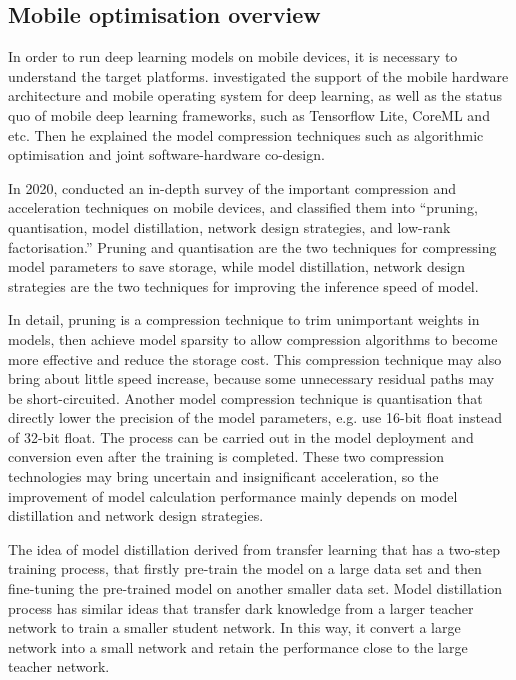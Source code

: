 \subsection{Mobile optimisation overview}
In order to run deep learning models on mobile devices, it is necessary to understand the target platforms.
\citet{deng2019deep} investigated the support of the mobile hardware architecture and mobile operating system for deep learning, as well as the status quo of mobile deep learning frameworks, such as Tensorflow Lite, CoreML and etc.
Then he explained the model compression techniques such as algorithmic optimisation and joint software-hardware co-design.

In 2020, \citet{chen2020deep} conducted an in-depth survey of the important compression and acceleration techniques on mobile devices, and classified them into ``pruning, quantisation, model distillation, network design strategies, and low-rank factorisation.''
Pruning and quantisation are the two techniques for compressing model parameters to save storage, while model distillation, network design strategies are the two techniques for improving the inference speed of model.

In detail, pruning is a compression technique to trim unimportant weights in models, then achieve model sparsity to allow compression algorithms to become more effective and reduce the storage cost.
This compression technique may also bring about little speed increase, because some unnecessary residual paths may be short-circuited.
Another model compression technique is quantisation that directly lower the precision of the model parameters, e.g. use 16-bit float instead of 32-bit float.
The process can be carried out in the model deployment and conversion even after the training is completed.
These two compression technologies may bring uncertain and insignificant acceleration, so the improvement of model calculation performance mainly depends on model distillation and network design strategies.

The idea of model distillation derived from transfer learning that has a two-step training process, that firstly pre-train the model on a large data set and then fine-tuning the pre-trained model on another smaller data set.
Model distillation process has similar ideas that transfer dark knowledge from a larger teacher network to train a smaller student network.
In this way, it convert a large network into a small network and retain the performance close to the large teacher network.